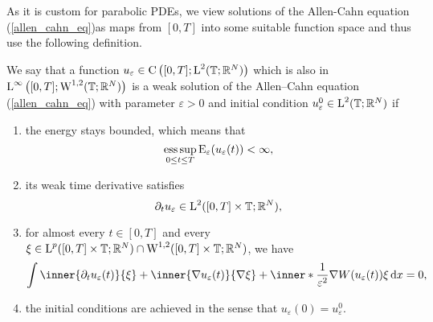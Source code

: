 As it is custom for parabolic PDEs, we view solutions of the Allen-Cahn equation (\ref{allen_cahn_eq})as maps from $ [0,T] $ into some suitable function space and thus use the following definition.

\begin{definition}
	\label{solution_to_ac}
	We say that a function 
	$ u_{ \varepsilon} \in 
	\mathrm{ C } \left( [0 , T ] ; \operatorname{L}^{ 2 } ( \mathbb{ T }; \mathbb{ R }^{ N } ) \right) $
	which is also in
	$\operatorname{L}^{ \infty } \left( [0, T ]; \operatorname{W}^{ 1, 2 } ( \mathbb{ T } ; \mathbb{ R }^{ N } ) \right)
	$
	is a weak solution of the Allen--Cahn equation (\ref{allen_cahn_eq}) with parameter $ \varepsilon > 0 $ and initial condition $ u_{ \varepsilon}^{ 0 } \in \operatorname{L}^{ 2 } ( \mathbb{ T } ; \mathbb{ R }^{ N } ) $ if
	\begin{enumerate}
		\item the energy stays bounded, which means that
		\begin{equation}
			\operatorname*{ess\,sup}_{ 0 \leq t \leq T }
				\operatorname{E}_{ \varepsilon } ( u_{ \varepsilon } ( t ) ) 
			< \infty,
		\end{equation}
		\item 
		its weak time derivative satisfies
		\begin{equation}
			\partial_{ t } u_{ \varepsilon }
			\in
			\operatorname{L}^{ 2 } ( [ 0 , T ] \times \mathbb{ T } ; \mathbb{ R }^{ N } ),
		\end{equation}
		\item 
		for almost every $ t \in [ 0 , T ] $ and every 
		$ \xi \in \operatorname{L}^{ p } ( [ 0 , T ] \times \mathbb{ T }; \mathbb{ R }^{ N } ) 
		\cap
		\operatorname{W}^{ 1, 2 } ( [ 0, T ] \times \mathbb{ T } ; \mathbb{ R }^{ N } ) $,
		we have
		\begin{equation}
			\label{ac_weak_equation}
			\int
				\inner{\partial_{ t } u_{ \varepsilon} ( t ) }{ \xi }
				+
				\inner{ \nabla u_{ \varepsilon } ( t ) }{ \nabla \xi } 
				+
				\inner*{ \frac{ 1 }{ \varepsilon^{ 2 } } \nabla W ( u_{ \varepsilon} ( t ) ) }{ \xi }
			\dd{x}
			=
			0,
		\end{equation}
		\item 
		the initial conditions are achieved in the sense that $ u_{ \varepsilon } ( 0 ) = u_{ \varepsilon}^{ 0 } $.
	\end{enumerate}
\end{definition}

